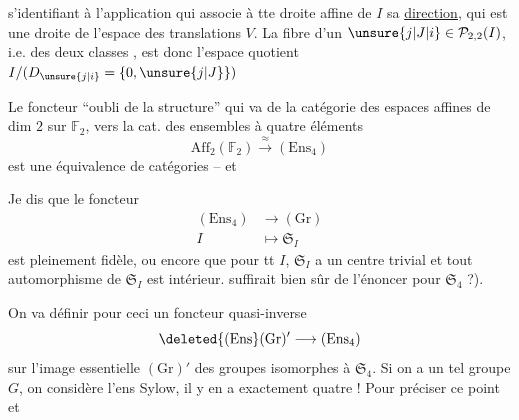 s'identifiant à l'application qui associe à tte droite affine de $I$ sa \uline{direction}, qui est une droite de l'espace des translations $V$. La fibre d'un $\unsure{j|J|i}\in\mathcal{P}_{2,2}(I)$, i.e.  des  deux classes , est donc l'espace quotient $I/(D_{\unsure{j|i}}=\{0,\unsure{j|J}\})$

Le foncteur ``oubli de la structure'' qui va de la  catégorie des espaces affines de dim $2$ sur $\mathbb{F}_2$, vers la cat. des ensembles à quatre éléments
\[
\mathrm{Aff}_2(\mathbb{F}_2)\xrightarrow{\approx}(\mathrm{Ens}_4)
\]
est une équivalence de catégories -- et 

Je dis que le foncteur
\[
\begin{aligned}
(\mathrm{Ens}_4)&\longrightarrow(\mathrm{Gr})\\
I&\longmapsto\mathfrak{S}_I
\end{aligned}
\]
est pleinement fidèle, ou encore que pour tt $I$, $\mathfrak{S}_I$ a  un centre trivial et tout automorphisme de $\mathfrak{S}_I$ est intérieur.   suffirait bien sûr de l'énoncer pour $\mathfrak{S}_4$ ?).

On va définir pour ceci un foncteur quasi-inverse
\[
\deleted{(\mathrm{Ens}}(\mathrm{Gr})'\longrightarrow(\mathrm{Ens}_4)
\]
sur l'image essentielle $(\mathrm{Gr})'$ des groupes isomorphes à $\mathfrak{S}_4$. Si on a un tel groupe $G$, on considère l'ens     Sylow, il y en a exactement quatre ! Pour préciser ce point et 
